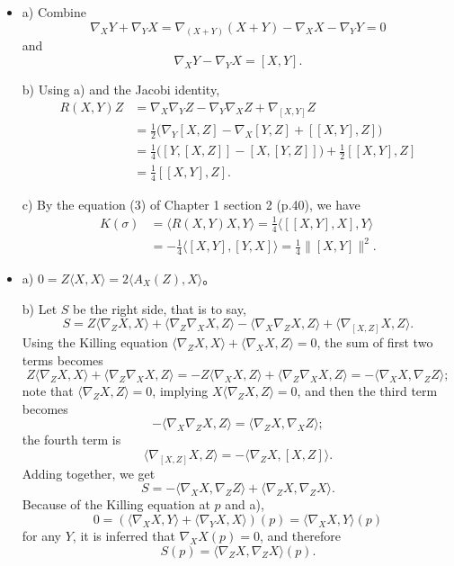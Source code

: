 \begin{itemize}
    \item[1.] a) Combine 
    \[\nabla_XY+\nabla_YX=\nabla_{(X+Y)}(X+Y)-\nabla_XX-\nabla_YY=0\]
    and
    \[\nabla_XY-\nabla_YX=[X,Y].\]

    b) Using a) and the Jacobi identity,
    \begin{align*}
        R(X,Y)Z&=\nabla_X\nabla_YZ-\nabla_Y\nabla_XZ+\nabla_{[X,Y]}Z\\
        &=\frac{1}{2}\big(\nabla_Y[X,Z]-\nabla_X[Y,Z]+[[X,Y],Z]\big)\\
        &=\frac{1}{4}\big([Y,[X,Z]]-[X,[Y,Z]]\big)+\frac{1}{2}[[X,Y],Z]\\
        &=\frac{1}{4}[[X,Y],Z].
    \end{align*}

    c) By the equation (3) of Chapter 1 section 2 (p.40), we have
    \begin{align*}
        K(\sigma)&=\langle R(X,Y)X,Y\rangle=\frac{1}{4}\langle[[X,Y],X],Y\rangle\\
        &=-\frac{1}{4}\langle[X,Y],[Y,X]\rangle=\frac{1}{4}\|[X,Y]\|^2.
    \end{align*}

    \item[2.] a) $0=Z\langle X,X \rangle=2\langle A_X(Z),X \rangle$。
    
    b) Let $S$ be the right side, that is to say,
    \[S=Z\langle\nabla_ZX,X\rangle+\langle\nabla_Z\nabla_XX,Z\rangle
    -\langle\nabla_X\nabla_ZX,Z\rangle+\langle\nabla_{[X,Z]}X,Z\rangle.\]
    Using the Killing equation $\langle\nabla_ZX,X\rangle
    +\langle\nabla_XX,Z\rangle=0$, the sum of first two terms becomes
    \[Z\langle\nabla_ZX,X\rangle+\langle\nabla_Z\nabla_XX,Z\rangle
    =-Z\langle\nabla_XX,Z\rangle+\langle\nabla_Z\nabla_XX,Z\rangle
    =-\langle\nabla_XX,\nabla_ZZ\rangle;\]
    note that $\langle\nabla_ZX,Z\rangle=0$, implying 
    $X\langle\nabla_ZX,Z\rangle=0$, and then the third term becomes
    \[-\langle\nabla_X\nabla_ZX,Z\rangle=\langle\nabla_ZX,\nabla_XZ\rangle;\]
    the fourth term is
    \[\langle\nabla_{[X,Z]}X,Z\rangle=-\langle\nabla_ZX,[X,Z]\rangle.\]
    Adding together, we get
    \[S=-\langle\nabla_XX,\nabla_ZZ\rangle+\langle\nabla_ZX,\nabla_ZX\rangle.\]
    Because of the Killing equation at $p$ and a), 
    \[0=(\langle\nabla_XX,Y\rangle+\langle\nabla_YX,X\rangle)(p)
    =\langle\nabla_XX,Y\rangle(p)\]
    for any $Y$, it is inferred that $\nabla_XX(p)=0$, and therefore
    \[S(p)=\langle\nabla_ZX,\nabla_ZX\rangle(p).\]


\end{itemize}
